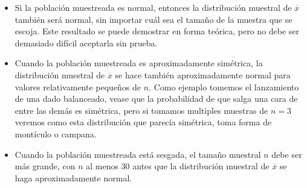 \documentclass[]{article}
\begin{document}
\begin{itemize}
	\item Si la población muestreada es normal, entonces la distribución muestral de $\overline{x}$ también será normal, sin importar cuál sea el tamaño de la muestra que se escoja. Este resultado se puede demostrar en forma teórica, pero no debe ser demasiado difícil aceptarla sin prueba.
	\item Cuando la población muestreada es aproximadamente simétrica, la distribución muestral de $\overline{x}$ se hace también aproximadamente normal para valores relativamente pequeños de $n$. Como ejemplo tomemos el lanzamiento de una dado balanceado, vease que la probabilidad de que salga una cara de entre las demás es simétrica, pero si tomamos multiples muestras de $n = 3$ veremos como esta distribución que parecía simétrica, toma forma de montículo o campana.
	\item Cuando la población muestreada está sesgada, el tamaño muestral $n$ debe ser más grande, con $n$ al menos 30 antes que la distribución muestral de $\overline{x}$  se haga aproximadamente normal.
\end{itemize}
\end{document}
